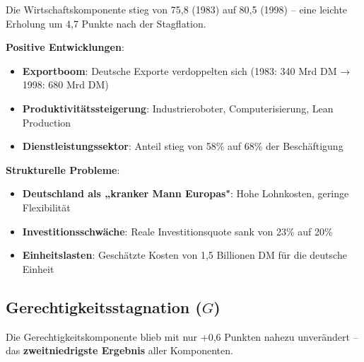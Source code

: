Die Wirtschaftskomponente stieg von 75,8 (1983) auf 80,5 (1998) – eine leichte Erholung um 4,7 Punkte nach der Stagflation.

\textbf{Positive Entwicklungen}:
\begin{itemize}
    \item \textbf{Exportboom}: Deutsche Exporte verdoppelten sich (1983: 340 Mrd DM → 1998: 680 Mrd DM)
    \item \textbf{Produktivitätssteigerung}: Industrieroboter, Computerisierung, Lean Production
    \item \textbf{Dienstleistungssektor}: Anteil stieg von 58\% auf 68\% der Beschäftigung
\end{itemize}

\textbf{Strukturelle Probleme}:
\begin{itemize}
    \item \textbf{Deutschland als „kranker Mann Europas"}: Hohe Lohnkosten, geringe Flexibilität
    \item \textbf{Investitionsschwäche}: Reale Investitionsquote sank von 23\% auf 20\%
    \item \textbf{Einheitslasten}: Geschätzte Kosten von 1,5 Billionen DM für die deutsche Einheit
\end{itemize}

\subsection{Gerechtigkeitsstagnation (\(G\))}

Die Gerechtigkeitskomponente blieb mit nur +0,6 Punkten nahezu unverändert – das \textbf{zweitniedrigste Ergebnis} aller Komponenten.

